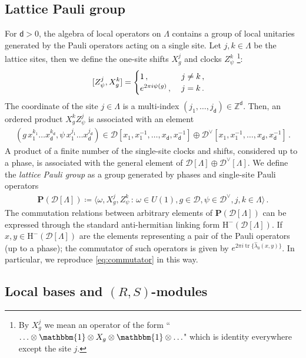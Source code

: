 \documentclass[sn-mathphys-num]{sn-jnl}
\theoremstyle{definition}
\numberwithin{equation}{section}
\theoremstyle{definition}
\def\CD {{\mathcal D}}
\def\CD {{\mathcal D}}
\def\hm{{\mbox{H}}^{-}}
\def\IZ{{\mathbb{Z}}}
\def\la{\langle}
\def\ra{\rangle}
\def\La{{\Lambda}}
\def\hl{{\hat \lambda}}
\def\tr{\operatorname{tr}}
\newcommand{\id}{\mathbbm{1}}
\newcommand{\dd}{{\mathsf{d}}} %
\begin{document}
\subsection{Lattice Pauli group}\label{sec:lattice_pauli_group}
For $\dd>0$, the algebra of local operators on $\La$ contains a group of local unitaries generated by the Pauli operators acting on a single site. Let $j,k\in \La$ be the lattice sites, then we define the one-site shifts $X_g^j$ and clocks $Z_{\psi}^k$ \footnote{By $X^j_g$ we mean an operator of the form ``$\ldots\otimes  \id \otimes X_g\otimes \id \otimes \ldots$" which is identity everywhere except the site $j$.}:
\begin{align}\label{eq:commutator}
[Z_{\psi}^j,X_g^k]=\begin{cases}
     1\,,\hspace{36pt}\,\, j\neq k\,,\\
     e^{2\pi i \psi(g)}\,,\hspace{4mm} j=k\,.
 \end{cases}
\end{align}
The coordinate of the site $j\in \La$ is a multi-index $(j_1,\ldots ,j_{\dd})\in \IZ^{\dd}$. Then, an ordered product $X_g^kZ_{\psi}^j$ is associated with an element 
\begin{align}
    (g\, x_{1}^{k_1}\ldots x_{\dd}^{k_{\dd}},\psi \, x_{1}^{j_1}\ldots x_{\dd}^{j_{\dd}})\in \CD[x_1,x_1^{-1},\ldots ,x_{\dd},x_{\dd}^{-1} ]\oplus \CD^{\vee}[x_1,x_1^{-1},\ldots ,x_{\dd},x_{\dd}^{-1} ]\,.
\end{align}
A product of a finite number of the single-site clocks and shifts, considered up to a phase, is associated with the general element of $\CD[\La]\oplus \CD^{\vee}[\La]$. We define the \textit{lattice Pauli group} as a group generated by phases and single-site Pauli operators
\begin{align}
    \textbf{P}(\CD[\La])\coloneqq\la\omega, X_{g}^j,Z_{\psi}^k\,:\,\omega\in U(1),g\in \CD,\psi\in \CD^{\vee},j,k\in \La\ra\,.
\end{align}
  The commutation relations between arbitrary elements of $\textbf{P}(\CD[\La])$ can be expressed through the standard anti-hermitian linking form $\hm(\CD[\La])$. If $x,y\in \hm(\CD[\La])$ are the elements representing a pair of the Pauli operators (up to a phase);  the commutator of such operators is given by $e^{2\pi i \tr\{\hl_0(x,y)\}}$. In particular, we reproduce \eqref{eq:commutator} in this way.

\subsection{Local bases and $(R,S)$-modules}\label{ref:local_bases}
\end{document}
